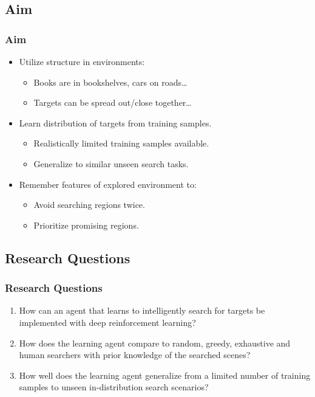\subsection{Aim}

\begin{frame}
    \frametitle{Aim}
    
    \begin{itemize}
        \item Utilize structure in environments:
        \begin{itemize}
            \item Books are in bookshelves, cars on roads\dots
            \item Targets can be spread out/close together\dots
        \end{itemize}
        \item Learn distribution of targets from training samples.
        \begin{itemize}
            \item Realistically limited training samples available.
            \item Generalize to similar unseen search tasks.
        \end{itemize}
        \item Remember features of explored environment to:
        \begin{itemize}
            \item Avoid searching regions twice.
            \item Prioritize promising regions.
        \end{itemize}
    \end{itemize}
\end{frame}

\subsection{Research Questions}

\begin{frame}
    \frametitle{Research Questions}
    \begin{enumerate}
        \item How can an agent that learns to intelligently search for targets be implemented with deep reinforcement learning?
        \item How does the learning agent compare to random, greedy, exhaustive and human searchers with prior knowledge of the searched scenes?
        \item How well does the learning agent generalize from a limited number of training samples to unseen in-distribution search scenarios?
    \end{enumerate}    
\end{frame}
